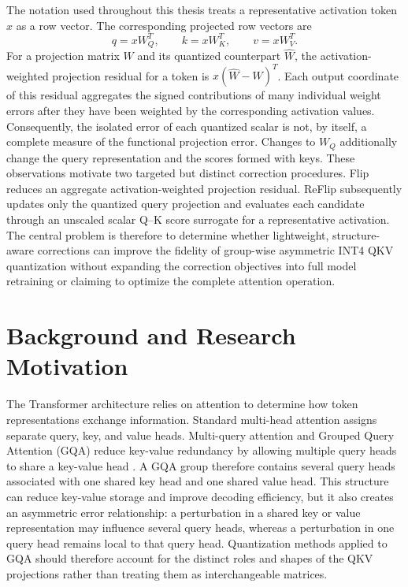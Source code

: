 The notation used throughout this thesis treats a representative activation token \(x\) as a row vector. The corresponding projected row vectors are
\[
    q = xW_Q^{T}, \qquad k = xW_K^{T}, \qquad v = xW_V^{T}.
\]
For a projection matrix \(W\) and its quantized counterpart \(\widehat{W}\), the activation-weighted projection residual for a token is \(x(\widehat{W}-W)^{T}\). Each output coordinate of this residual aggregates the signed contributions of many individual weight errors after they have been weighted by the corresponding activation values. Consequently, the isolated error of each quantized scalar is not, by itself, a complete measure of the functional projection error. Changes to \(W_Q\) additionally change the query representation and the scores formed with keys. These observations motivate two targeted but distinct correction procedures. Flip reduces an aggregate activation-weighted projection residual. ReFlip subsequently updates only the quantized query projection and evaluates each candidate through an unscaled scalar Q--K score surrogate for a representative activation. The central problem is therefore to determine whether lightweight, structure-aware corrections can improve the fidelity of group-wise asymmetric INT4 QKV quantization without expanding the correction objectives into full model retraining or claiming to optimize the complete attention operation.

\section{Background and Research Motivation}

The Transformer architecture relies on attention to determine how token representations exchange information. Standard multi-head attention assigns separate query, key, and value heads. Multi-query attention and Grouped Query Attention (GQA) reduce key-value redundancy by allowing multiple query heads to share a key-value head \cite{shazeer2019fast,ainslie2023gqa}. A GQA group therefore contains several query heads associated with one shared key head and one shared value head. This structure can reduce key-value storage and improve decoding efficiency, but it also creates an asymmetric error relationship: a perturbation in a shared key or value representation may influence several query heads, whereas a perturbation in one query head remains local to that query head. Quantization methods applied to GQA should therefore account for the distinct roles and shapes of the QKV projections rather than treating them as interchangeable matrices.

